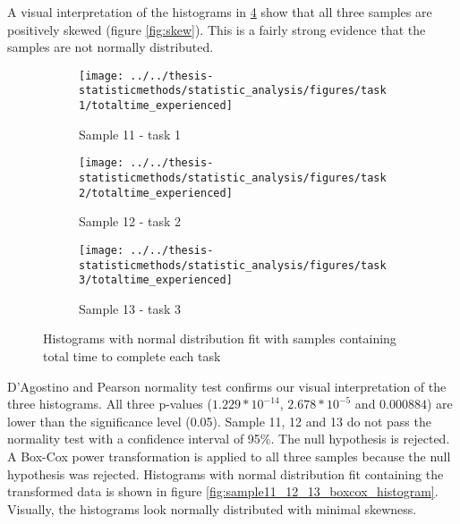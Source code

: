 A visual interpretation of the histograms in \ref{fig:sample11_12_13_histogram} show that all three samples are positively skewed (figure \ref{fig:skew}). This is a fairly strong evidence that the samples are not normally distributed.

 \begin{figure}[H]
 	\centering
	 \begin{subfigure}[b]{0.32\textwidth}
	 	\centering
	 	\texttt{[image: ../../thesis-statisticmethods/statistic\_analysis/figures/task1/totaltime\_experienced]}
	 	\caption{Sample 11 - task 1}
	 	\label{fig:totaltimeexperienced_task1}
	 \end{subfigure}
	 \begin{subfigure}[b]{0.32\textwidth}
	 	\centering
	 	\texttt{[image: ../../thesis-statisticmethods/statistic\_analysis/figures/task2/totaltime\_experienced]}
	 	\caption{Sample 12 - task 2}
	 	\label{fig:totaltimeexperienced_task2}
	 \end{subfigure}
	 \begin{subfigure}[b]{0.32\textwidth}
	 	\centering
	 	\texttt{[image: ../../thesis-statisticmethods/statistic\_analysis/figures/task3/totaltime\_experienced]}
	 	\caption{Sample 13 - task 3}
	 	\label{fig:totaltimeexperienced}
	 \end{subfigure}
 	\caption{Histograms with normal distribution fit with samples containing total time to complete each task}
 	\label{fig:sample11_12_13_histogram}
 \end{figure}
 
D'Agostino and Pearson normality test confirms our visual interpretation of the three histograms. All three p-values ($1.229 * 10^{-14}$, $2.678 * 10^{-5}$ and $0.000884$) are lower than the significance level (0.05). Sample 11, 12 and 13 do not pass the normality test with a confidence interval of 95\%. The null hypothesis is rejected. \\[0.2cm]

A Box-Cox power transformation is applied to all three samples because the null hypothesis was rejected. Histograms with normal distribution fit containing the transformed data is shown in figure \ref{fig:sample11_12_13_boxcox_histogram}. Visually, the histograms look normally distributed with minimal skewness. \\

